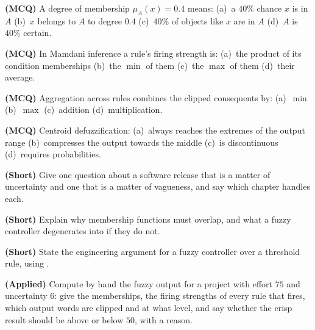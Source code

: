 \begin{reviewq}
  \item \textbf{(MCQ)} A degree of membership $\mu_{A}(x) = 0.4$ means:
        (a)~a $40\%$ chance $x$ is in $A$ (b)~$x$ belongs to $A$ to degree $0.4$
        (c)~$40\%$ of objects like $x$ are in $A$ (d)~$A$ is $40\%$ certain.
  \item \textbf{(MCQ)} In Mamdani inference a rule's firing strength is:
        (a)~the product of its condition memberships (b)~the $\min$ of them
        (c)~the $\max$ of them (d)~their average.
  \item \textbf{(MCQ)} Aggregation across rules combines the clipped consequents
        by: (a)~$\min$ (b)~$\max$ (c)~addition (d)~multiplication.
  \item \textbf{(MCQ)} Centroid defuzzification: (a)~always reaches the extremes of
        the output range (b)~compresses the output towards the middle
        (c)~is discontinuous (d)~requires probabilities.
  \item \textbf{(Short)} Give one question about a software release that is a
        matter of uncertainty and one that is a matter of vagueness, and say which
        chapter handles each.
  \item \textbf{(Short)} Explain why membership functions must overlap, and what a
        fuzzy controller degenerates into if they do not.
  \item \textbf{(Short)} State the engineering argument for a fuzzy controller over
        a threshold rule, using .
  \item \textbf{(Applied)} Compute by hand the fuzzy output for a project with
        effort $75$ and uncertainty $6$: give the memberships, the firing strengths
        of every rule that fires, which output words are clipped and at what level,
        and say whether the crisp result should be above or below $50$, with a
        reason.
\end{reviewq}
